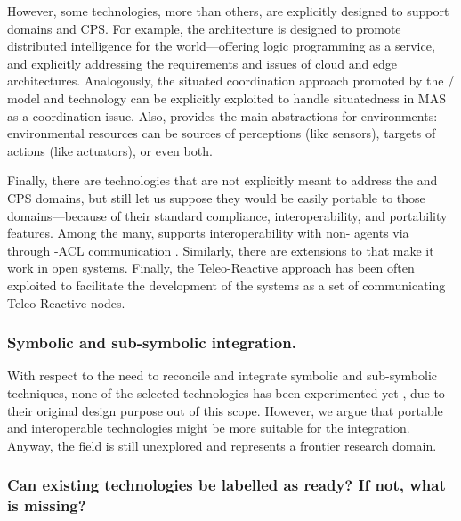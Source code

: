 \documentclass[12pt,a4paper,openright,twoside]{book}
\begin{document}
However, some technologies, more than others, are explicitly designed to support \iot{} domains and CPS.
%
For example, the \lpaas{} architecture \cite{lpaas-tplp18} is designed to promote distributed intelligence for the \iot{} world---offering logic programming as a service, and explicitly addressing the requirements and issues of cloud and edge architectures.
%
Analogously, the situated coordination approach promoted by the \tucson{}/\respect{} model and technology can be explicitly exploited to handle situatedness in MAS as a coordination issue.
%
Also, \tucson{} \cite{tucson-jaamas2} provides the main abstractions for \iot{} environments: environmental resources can be sources of perceptions (like sensors), targets of actions (like actuators), or even both.

Finally, there are technologies that are not explicitly meant to address the \iot{} and CPS domains, but still let us suppose they would be easily portable to those domains---because of their standard compliance, interoperability, and portability features.
%
Among the many, \jason{} \cite{jason-clima2005} supports interoperability with non-\jason{} agents via \jade{} \cite{jade-mapbook2005} through \fipa{}-ACL communication \cite{fipa-acl}.
%
Similarly, there are extensions to \jack{} \cite{jack-mapbook2005} that make it work in open systems.
%
Finally, the Teleo-Reactive \cite{nilsson2001-teleoreactive} approach has been often exploited to facilitate the development of the \iot{} systems as a set of communicating Teleo-Reactive nodes.

\subsubsection{Symbolic and sub-symbolic integration.}

With respect to the need to reconcile and integrate symbolic and sub-symbolic techniques, none of the selected technologies has been experimented yet \cite{xaisurvey-ia14}, due to their original design purpose out of this scope.
%
However, we argue that portable and interoperable technologies might be more suitable for the integration.
%
Anyway, the field is still unexplored and represents a frontier research domain.

\subsubsection{Can existing technologies be labelled as ready? If not, what is missing?}
\end{document}
